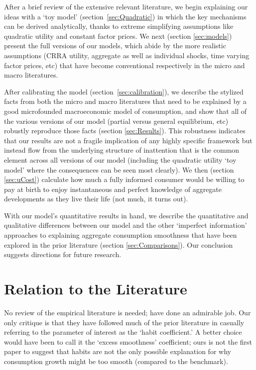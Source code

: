 \documentclass[titlepage]{\econtex}\newcommand{\texname}{cAndCwithStickyE}
\begin{document}
After a brief review of the extensive relevant literature, we begin explaining our ideas with a `toy model' (section~\ref{sec:Quadratic}) in which the key mechanisms can be derived analytically, thanks to extreme simplifying assumptions like quadratic utility and constant factor prices.  We next (section \ref{sec:models}) present the full versions of our models, which abide by the more realistic assumptions (CRRA utility, aggregate as well as individual shocks, time varying factor prices, etc) that have become conventional respectively in the micro and macro literatures.

After calibrating the model (section~\ref{sec:calibration}), we describe the stylized facts from both the micro and macro literatures that need to be explained by a good microfounded macroeconomic model of consumption, and show that all of the various versions of our model (partial versus general equilibrium, etc) robustly reproduce those facts (section \ref{sec:Results}).  This robustness indicates that our results are not a fragile implication of any highly specific framework but instead flow from the underlying structure of inattention that is the common element across all versions of our model (including the quadratic utility `toy model' where the consequences can be seen most clearly).  We then (section \ref{sec:uCost}) calculate how much a fully informed consumer would be willing to pay at birth to enjoy instantaneous and perfect knowledge of aggregate developments as they live their life (not much, it turns out).

With our model's quantitative results in hand, we describe the quantitative and qualitative differences between our model and the other `imperfect information' approaches to explaining aggregate consumption smoothness that have been explored in the prior literature (section \ref{sec:Comparisons}).  Our conclusion suggests directions for future research.



\section{Relation to the Literature}\label{sec:relation}

No review of the empirical literature is needed; \cite{hrsHabit} have done an admirable job.  Our only critique is that they have followed much of the prior literature in casually referring to the parameter of interest as the `habit coefficient.'  A better choice would have been to call it the `excess smoothness' coefficient; ours is not the first paper to suggest that habits are not the only possible explanation for why consumption growth might be too smooth (compared to the \cite{hallRandomWalk} benchmark).
\end{document}
